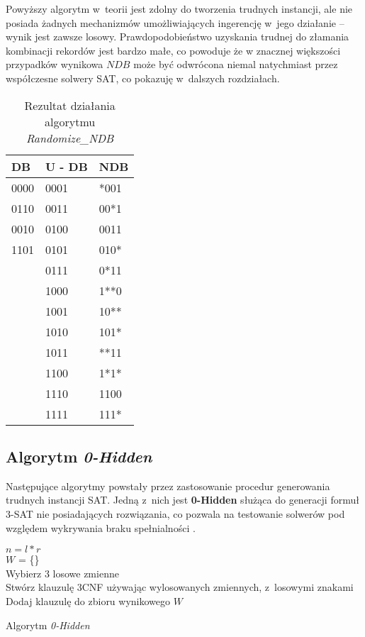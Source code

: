 Powyższy algorytm w~teorii jest zdolny do tworzenia trudnych instancji, ale nie posiada żadnych mechanizmów umożliwiających ingerencję w~jego działanie -- wynik jest zawsze losowy.
Prawdopodobieństwo uzyskania trudnej do złamania kombinacji rekordów jest bardzo małe, co powoduje że w znacznej większości przypadków wynikowa $NDB$ może być odwrócona niemal natychmiast przez współczesne solwery SAT, co pokazuję w~dalszych rozdziałach.       


\begin{table}[!htb]
    \centering
    \begin{tabular}{|l|l|l|}
    	\hline
    	DB   & U - DB & NDB  \\ \hline
    	0000 & 0001   & *001 \\
    	0110 & 0011   & 00*1 \\
    	0010 & 0100   & 0011 \\
    	1101 & 0101   & 010* \\
    	     & 0111   & 0*11 \\
    	     & 1000   & 1**0 \\
    	     & 1001   & 10**     \\
    	     & 1010   & 101*    \\
    	     & 1011   & **11     \\
    	     & 1100   & 1*1*     \\
    	     & 1110   & 1100    \\
    	     & 1111   & 111*     \\ \hline
    \end{tabular}
    \caption{Rezultat działania algorytmu \textit{Randomize\_NDB}}
    \label{tbl:randomized_results}
\end{table}


\subsection{Algorytm \textit{0-Hidden}}
\label{sec:0hidden}
Następujące algorytmy powstały przez zastosowanie procedur generowania trudnych instancji SAT.
Jedną z~nich jest \textbf{0-Hidden} służąca do generacji formuł 3-SAT nie posiadających rozwiązania, co pozwala na testowanie solwerów 
pod względem wykrywania braku spełnialności \cite{GeneratingHardFormulasByHidingSolutionsDeceptively}.

 \begin{algorithm}[!htb]
     \SetAlgoLined
     
     $n = l * r$\\
     $W$ = \{\}\\
     {
         Wybierz 3 losowe zmienne\\
         Stwórz klauzulę 3CNF używając wylosowanych zmiennych, z~losowymi znakami\\
         Dodaj klauzulę do zbioru wynikowego $W$
     } 
     
     \caption{Algorytm \textit{0-Hidden}}
     \label{alg:0hidden}
 \end{algorithm}

